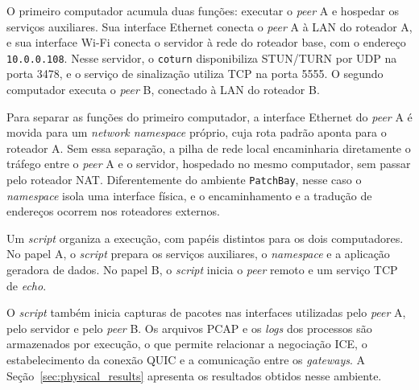 O primeiro computador acumula duas funções: executar o \textit{peer} A e hospedar os serviços auxiliares. Sua interface Ethernet conecta o \textit{peer} A à LAN do roteador A, e sua interface Wi-Fi conecta o servidor à rede do roteador base, com o endereço \texttt{10.0.0.108}. Nesse servidor, o \texttt{coturn} disponibiliza STUN/TURN por UDP na porta 3478, e o serviço de sinalização utiliza TCP na porta 5555. O segundo computador executa o \textit{peer} B, conectado à LAN do roteador B.

Para separar as funções do primeiro computador, a interface Ethernet do \textit{peer} A é movida para um \textit{network namespace} próprio, cuja rota padrão aponta para o roteador A. Sem essa separação, a pilha de rede local encaminharia diretamente o tráfego entre o \textit{peer} A e o servidor, hospedado no mesmo computador, sem passar pelo roteador NAT. Diferentemente do ambiente \texttt{PatchBay}, nesse caso o \textit{namespace} isola uma interface física, e o encaminhamento e a tradução de endereços ocorrem nos roteadores externos.

Um \textit{script} organiza a execução, com papéis distintos para os dois computadores. No papel A, o \textit{script} prepara os serviços auxiliares, o \textit{namespace} e a aplicação geradora de dados. No papel B, o \textit{script} inicia o \textit{peer} remoto e um serviço TCP de \textit{echo}.

O \textit{script} também inicia capturas de pacotes nas interfaces utilizadas pelo \textit{peer} A, pelo servidor e pelo \textit{peer} B. Os arquivos PCAP e os \textit{logs} dos processos são armazenados por execução, o que permite relacionar a negociação ICE, o estabelecimento da conexão QUIC e a comunicação entre os \textit{gateways}. A Seção~\ref{sec:physical_results} apresenta os resultados obtidos nesse ambiente.
